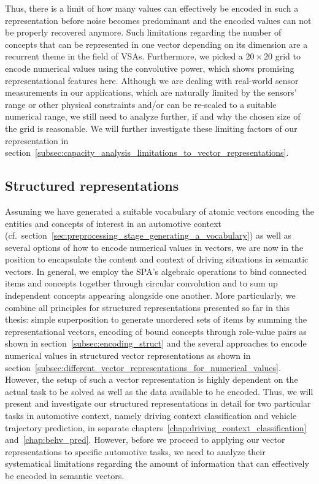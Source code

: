 Thus, there is a limit of how many values can effectively be encoded in such a representation before noise becomes predominant and the encoded values can not be properly recovered anymore.
Such limitations regarding the number of concepts that can be represented in one vector depending on its dimension are a recurrent theme in the field of \acp{VSA}. 
Furthermore, we picked a $20 \times 20$ grid to encode numerical values using the convolutive power, which shows promising representational features here.
Although we are dealing with real-world sensor measurements in our applications, which are naturally limited by the sensors' range or other physical constraints and/or can be re-scaled to a suitable numerical range, we still need to analyze further, if and why the chosen size of the grid is reasonable.
We will further investigate these limiting factors of our representation in section~\ref{subsec:capacity_analysis_limitations_to_vector_representations}.

\subsection{Structured representations}%
\label{subsec:structured_representations}

Assuming we have generated a suitable vocabulary of atomic vectors encoding the entities and concepts of interest in an automotive context (cf.\ section~\ref{sec:preprocessing_stage_generating_a_vocabulary}) as well as several options of how to encode numerical values in vectors, we are now in the position to encapsulate the content and context of driving situations in semantic vectors.
In general, we employ the \ac{SPA}'s algebraic operations to bind connected items and concepts together through circular convolution and to sum up independent concepts appearing alongside one another.
More particularly, we combine all principles for structured representations presented so far in this thesis: simple superposition to generate unordered sets of items by summing the representational vectors, encoding of bound concepts through role-value pairs as shown in section~\ref{subsec:encoding_struct} and the several approaches to encode numerical values in structured vector representations as shown in section~\ref{subsec:different_vector_representations_for_numerical_values}.
However, the setup of such a vector representation is highly dependent on the actual task to be solved as well as the data available to be encoded.
Thus, we will present and investigate our structured representations in detail for two particular tasks in automotive context, namely driving context classification and vehicle trajectory prediction, in separate chapters~\ref{chap:driving_context_classification} and~\ref{chap:behv_pred}.
However, before we proceed to applying our vector representations to specific automotive tasks, we need to analyze their systematical limitations regarding the amount of information that can effectively be encoded in semantic vectors.

